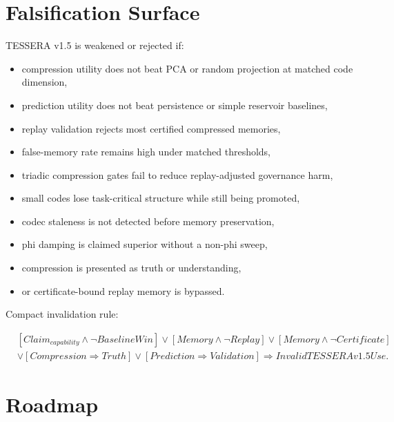 \documentclass[12pt]{article}
\begin{document}
\section{Falsification Surface}

TESSERA v1.5 is weakened or rejected if:

\begin{itemize}
\item compression utility does not beat PCA or random projection at matched
code dimension,
\item prediction utility does not beat persistence or simple reservoir baselines,
\item replay validation rejects most certified compressed memories,
\item false-memory rate remains high under matched thresholds,
\item triadic compression gates fail to reduce replay-adjusted governance harm,
\item small codes lose task-critical structure while still being promoted,
\item codec staleness is not detected before memory preservation,
\item phi damping is claimed superior without a non-phi sweep,
\item compression is presented as truth or understanding,
\item or certificate-bound replay memory is bypassed.
\end{itemize}

Compact invalidation rule:

\[
\begin{aligned}
&[Claim_{capability}\wedge\neg BaselineWin]
\vee [Memory\wedge\neg Replay]\vee[Memory\wedge\neg Certificate]\\
&\vee[Compression\Rightarrow Truth]
\vee[Prediction\Rightarrow Validation]
\Rightarrow InvalidTESSERAv1.5Use.
\end{aligned}
\]

\section{Roadmap}
\end{document}
